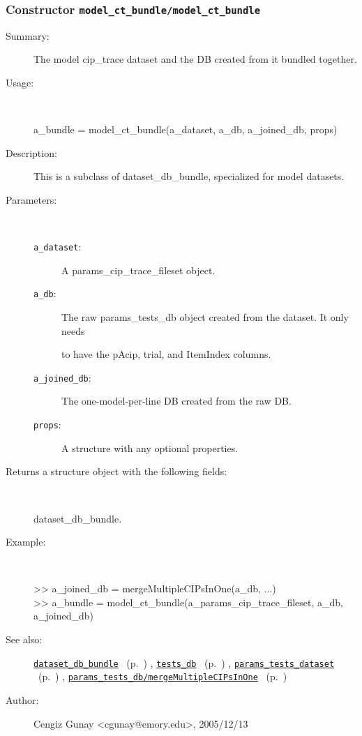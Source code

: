 \subsubsection[Constructor \texttt{model\_ct\_bundle}]{Constructor \texttt{model\_ct\_bundle/model\_ct\_bundle}}%
%
\label{ref_model_ct_bundle__model_ct_bundle}%
\hypertarget{ref_model_ct_bundle__model_ct_bundle}{}%
\begin{description}
\item[Summary:]The model cip\_trace dataset and the DB created from it bundled together.
%
\item[Usage:]~%
\begin{lyxcode}%
a\_bundle = model\_ct\_bundle(a\_dataset, a\_db, a\_joined\_db, props)
%
\end{lyxcode}%
%
\item[Description:]%
This is a subclass of dataset\_db\_bundle, specialized for model datasets. 
\item[Parameters:]~
\begin{description}%
\item[\texttt{a\_dataset}:]
 A params\_cip\_trace\_fileset object.
\item[\texttt{a\_db}:]
 The raw params\_tests\_db object created from the dataset. It only needs

to have the pAcip, trial, and ItemIndex columns.\item[\texttt{a\_joined\_db}:]
 The one-model-per-line DB created from the raw DB.
\item[\texttt{props}:]
 A structure with any optional properties.
\end{description}%
%
\item[Returns a structure object with the following fields:]~

	dataset\_db\_bundle.
%
\item[Example:]~
\begin{lyxcode} >> a\_joined\_db = mergeMultipleCIPsInOne(a\_db, ...)\\%
 >> a\_bundle = model\_ct\_bundle(a\_params\_cip\_trace\_fileset, a\_db, a\_joined\_db)\\%
\end{lyxcode}
%
\item[See also:]%
\hyperlink{ref_dataset_db_bundle}{\texttt{dataset\_db\_bundle}}%
\ (p.~\pageref{ref_dataset_db_bundle})%
%
, \hyperlink{ref_tests_db}{\texttt{tests\_db}}%
\ (p.~\pageref{ref_tests_db})%
%
, \hyperlink{ref_params_tests_dataset}{\texttt{params\_tests\_dataset}}%
\ (p.~\pageref{ref_params_tests_dataset})%
%
, \hyperlink{ref_params_tests_db__mergeMultipleCIPsInOne}{\texttt{params\_tests\_db/mergeMultipleCIPsInOne}}%
\ (p.~\pageref{ref_params_tests_db__mergeMultipleCIPsInOne})%
%
%
\item[Author:]%
Cengiz Gunay <cgunay@emory.edu>, 2005/12/13%
\end{description}
\methodline%
